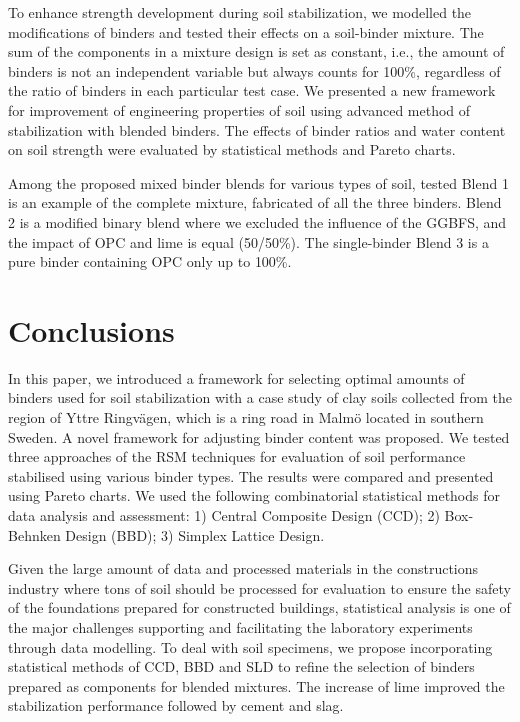 \documentclass[eprint,
]{actapoly}
\begin{document}
To enhance strength development during soil stabilization, we modelled the modifications of binders and tested their effects on a soil-binder mixture. The sum of the components in a mixture design is set as constant, i.e., the amount of binders is not an independent variable but always counts for 100\%, regardless of the ratio of binders in each particular test case. We presented a new framework for improvement of engineering properties of soil using advanced method of stabilization with blended binders. The effects of binder ratios and water content on soil strength were evaluated by statistical methods and Pareto charts.

Among the proposed mixed binder blends for various types of soil, tested Blend 1 is an example of the complete mixture, fabricated of all the three binders. Blend 2 is a modified binary blend where we excluded the influence of the GGBFS, and the impact of OPC and lime is equal (50/50\%). The single-binder Blend 3 is a pure binder containing OPC only up to 100\%. 

\section{Conclusions}
In this paper, we introduced a framework for selecting optimal amounts of binders used for soil stabilization with a case study of clay soils collected from the region of Yttre Ringvägen, which is a ring road in Malmö located in southern Sweden. A novel framework for adjusting binder content was proposed. We tested three approaches of the RSM techniques for evaluation of soil performance stabilised using various binder types. The results were compared and presented using Pareto charts. We used the following combinatorial statistical methods for data analysis and assessment: 1) Central Composite Design (CCD); 2) Box-Behnken Design (BBD); 3) Simplex Lattice Design. 

Given the large amount of data and processed materials in the constructions industry where tons of soil should be processed for evaluation to ensure the safety of the foundations prepared for constructed buildings, statistical analysis is one of the major challenges supporting and facilitating the laboratory experiments through data modelling. To deal with soil specimens, we propose incorporating statistical methods of CCD, BBD and SLD to refine the selection of binders prepared as components for blended mixtures. The increase of lime improved the stabilization performance followed by cement and slag. 
\end{document}
